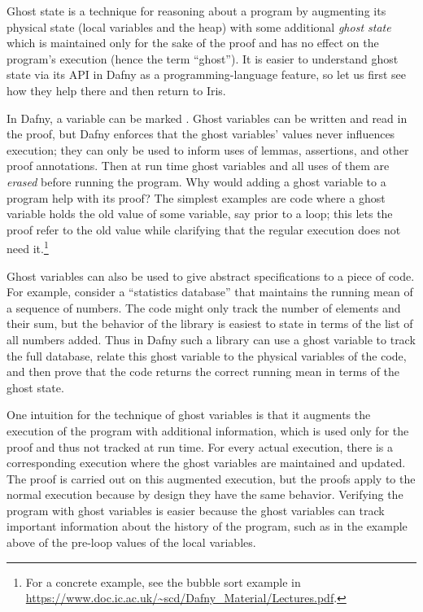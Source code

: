 Ghost state is a technique for reasoning about a program by augmenting its
physical state (local variables and the heap) with some additional \emph{ghost
state} which is maintained only for the sake of the proof and has no effect on
the program's execution (hence the term ``ghost''). It is easier to understand
ghost state via its API in Dafny as a programming-language feature, so let
us first see how they help there and then return to Iris.

In Dafny, a variable can be marked . Ghost variables can be written
and read in the proof, but Dafny enforces that the ghost variables' values never
influences execution; they can only be used to inform uses of lemmas,
assertions, and other proof annotations. Then at run time ghost variables and all
uses of them are \emph{erased} before running the program. Why would adding a
ghost variable to a program help with its proof? The simplest examples are code
where a ghost variable holds the old value of some variable, say prior to a
loop; this lets the proof refer to the old value while clarifying that the
regular execution does not need it.\footnote{For a concrete example, see the
bubble sort example in
\url{https://www.doc.ic.ac.uk/~scd/Dafny_Material/Lectures.pdf}.}

Ghost variables can also be used to give abstract specifications to a piece of
code. For example, consider a ``statistics database'' that maintains the running
mean of a sequence of numbers. The code might only track the number of elements and
their sum, but the behavior of the library is easiest to state in terms of the list of all
numbers added. Thus in Dafny such a library can use a ghost variable to track
the full database, relate this ghost variable to the physical variables
of the code, and then prove that the code returns the correct running mean in
terms of the ghost state.

One intuition for the technique of ghost variables is that it augments the
execution of the program with additional information, which is used only for the proof
and thus not tracked at run time. For every actual execution, there is a
corresponding execution where the ghost variables are maintained and updated.
The proof is carried out on this augmented execution,
but the proofs apply to the normal execution because by design they have the
same behavior. Verifying the program with ghost
variables is easier because the ghost variables can track important
information about the history of the program, such as in the example above of
the pre-loop values of the local variables.

